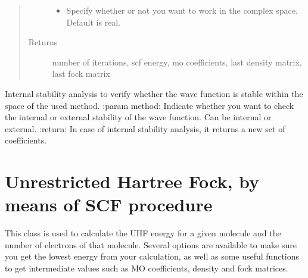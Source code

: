 \documentclass[letterpaper,10pt,english]{sphinxmanual}
\begin{document}
\begin{fulllineitems}
\begin{fulllineitems}
\begin{quote}
\begin{description}
\begin{itemize}
\item {} 
 \textendash{} Specify whether or not you want to work in the complex space. Default is real.

\end{itemize}

\item[{Returns}] \leavevmode
number of iterations, scf energy, mo coefficients, last density matrix, last fock matrix

\end{description}\end{quote}

\end{fulllineitems}


\begin{fulllineitems}
\label{\detokenize{RHF:hf.HartreeFock.RHF.MF.stability_analysis}}
Internal stability analysis to verify whether the wave function is stable within the space of the used method.
:param method: Indicate whether you want to check the internal or external stability of the wave function. Can
be internal or external.
:return: In case of internal stability analysis, it returns a new set of coefficients.

\end{fulllineitems}


\end{fulllineitems}

\label{\detokenize{UHF:module-hf.HartreeFock.UHF}}

\chapter{Unrestricted Hartree Fock, by means of SCF procedure}
\label{\detokenize{UHF:unrestricted-hartree-fock-by-means-of-scf-procedure}}\label{\detokenize{UHF::doc}}
This class is used to calculate the UHF energy for a given molecule and the number of electrons of that molecule.
Several options are available to make sure you get the lowest energy from your calculation, as well as some useful
functions to get intermediate values such as MO coefficients, density and fock matrices.
\end{document}
